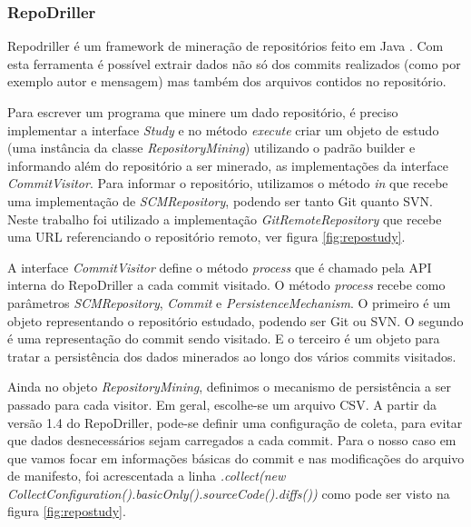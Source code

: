 \documentclass[a4paper,12pt]{article}
\begin{document}

\subsubsection{RepoDriller}%
\label{sec:repodriller}
Repodriller é um framework de mineração de repositórios feito em Java  \cite{repodriller}. Com esta ferramenta é possível extrair dados não só dos commits realizados (como por exemplo autor e mensagem) mas também dos arquivos contidos no repositório.

Para escrever um programa que minere um dado repositório, é preciso implementar a interface \textit{Study} e no método \textit{execute} criar um objeto de estudo (uma instância da classe \textit{RepositoryMining}) utilizando o padrão builder e informando além do repositório a ser minerado, as implementações da interface \textit{CommitVisitor}.  Para informar o repositório, utilizamos o método \textit{in} que recebe uma implementação de  \textit{SCMRepository}, podendo ser tanto Git quanto SVN. Neste trabalho foi utilizado a implementação \textit{GitRemoteRepository} que recebe uma URL referenciando o repositório remoto, ver figura \ref{fig:repostudy}.

A interface \textit{CommitVisitor} define o método \textit{process} que é chamado pela API interna do RepoDriller a cada commit visitado. O método \textit{process} recebe como parâmetros \textit{SCMRepository}, \textit{Commit} e \textit{PersistenceMechanism}. O primeiro é um objeto representando o repositório estudado, podendo ser Git ou SVN. O segundo é uma representação do commit sendo visitado. E o terceiro é um objeto para tratar a persistência dos dados minerados ao longo dos vários commits visitados.

Ainda no objeto \textit{RepositoryMining}, definimos o mecanismo de persistência a ser passado para cada visitor. Em geral, escolhe-se um arquivo CSV. A partir da versão 1.4 do RepoDriller, pode-se definir uma configuração de coleta, para evitar que dados desnecessários sejam carregados a cada commit. Para o nosso caso em que vamos focar em informações básicas do commit e nas modificações do arquivo de manifesto, foi acrescentada a linha \textit{.collect(new CollectConfiguration().basicOnly().sourceCode().diffs())} como pode ser visto na figura \ref{fig:repostudy}.
\end{document}
